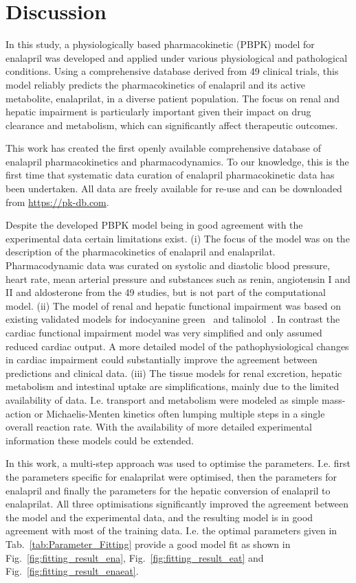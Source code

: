 \documentclass[pharmaceutics,article,submit,pdftex,moreauthors]{Definitions/mdpi}
\begin{document}
\section{Discussion}
In this study, a physiologically based pharmacokinetic (PBPK) model for enalapril was developed and applied under various physiological and pathological conditions. Using a comprehensive database derived from 49 clinical trials, this model reliably predicts the pharmacokinetics of enalapril and its active metabolite, enalaprilat, in a diverse patient population. The focus on renal and hepatic impairment is particularly important given their impact on drug clearance and metabolism, which can significantly affect therapeutic outcomes.

This work has created the first openly available comprehensive database of enalapril pharmacokinetics and pharmacodynamics. To our knowledge, this is the first time that systematic data curation of enalapril pharmacokinetic data has been undertaken. All data are freely available for re-use and can be downloaded from \href{https://pk-db.com}{https://pk-db.com}.

Despite the developed PBPK model being in good agreement with the experimental data certain limitations exist. (i) The focus of the model was on the description of the pharmacokinetics of enalapril and enalaprilat. Pharmacodynamic data was curated on systolic and diastolic blood pressure, heart rate, mean arterial pressure and substances such as renin, angiotensin I and II and aldosterone from the 49 studies, but is not part of the computational model. (ii) The model of renal and hepatic functional impairment was based on existing validated models for indocyanine green~\cite{Koller2021, Koller2021a} and talinolol~\cite{Mallol2023}. In contrast the cardiac functional impairment model was very simplified and only assumed reduced cardiac output. A more detailed model of the pathophysiological changes in cardiac impairment could substantially improve the agreement between predictions and clinical data. (iii) The tissue models for renal excretion, hepatic metabolism and intestinal uptake are simplifications, mainly due to the limited availability of data. I.e. transport and metabolism were modeled as simple mass-action or Michaelis-Menten kinetics often lumping multiple steps in a single overall reaction rate. With the availability of more detailed experimental information these models could be extended.

In this work, a multi-step approach was used to optimise the parameters. I.e. first the parameters specific for enalaprilat were optimised, then the parameters for enalapril and finally the parameters for the hepatic conversion of enalapril to enalaprilat. All three optimisations significantly improved the agreement between the model and the experimental data, and the resulting model is in good agreement with most of the training data. I.e. the optimal parameters given in Tab.~\ref{tab:Parameter_Fitting} provide a good model fit as shown in Fig.~\ref{fig:fitting_result_ena}, Fig.~\ref{fig:fitting_result_eat} and Fig.~\ref{fig:fitting_result_enaeat}. 
\end{document}
